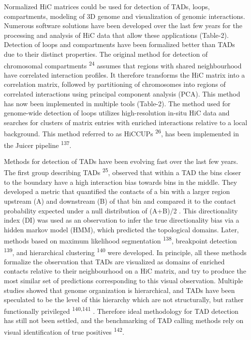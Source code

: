 \documentclass[11pt,twoside]{MPIthesis}
\theoremstyle{definition}
\theoremstyle{definition}
\theoremstyle{definition}
\theoremstyle{remark}
\begin{document}
Normalized HiC matrices could be used for detection of TADs, loops,
compartments, modeling of 3D genome and visualization of genomic
interactions. Numerous software solutions have been developed over the
last few years for the processing and analysis of HiC data that allow
these applications (Table-2). Detection of loops and compartments have
been formalized better than TADs due to their distinct properties. The
original method for detection of chromosomal compartments
\textsuperscript{24} assumes that regions with shared neighbourhood have
correlated interaction profiles. It therefore transforms the HiC matrix
into a correlation matrix, followed by partitioning of chromosomes into
regions of correlated interactions using principal component analysis
(PCA). This method has now been implemented in multiple tools (Table-2).
The method used for genome-wide detection of loops utilizes
high-resolution in-situ HiC data and searches for clusters of matrix
entries with enriched interactions relative to a local background. This
method referred to as HiCCUPs \textsuperscript{26}, has been implemented
in the Juicer pipeline \textsuperscript{137}.

Methods for detection of TADs have been evolving fast over the last few
years. The first group describing TADs \textsuperscript{25}, observed
that within a TAD the bins closer to the boundary have a high
interaction bias towards bins in the middle. They developed a metric
that quantified the contacts of a bin with a larger region upstream (A)
and downstream (B) of that bin and compared it to the contact
probability expected under a null distribution of (A+B)/2 . This
directionality index (DI) was used as an observation to infer the true
directionality bias via a hidden markov model (HMM), which predicted the
topological domains. Later, methods based on maximum likelihood
segmentation \textsuperscript{138}, breakpoint detection
\textsuperscript{139}, and hierarchical clustering \textsuperscript{140}
were developed. In principle, all these methods formalize the
observation that TADs are visualized as domains of enriched contacts
relative to their neighbourhood on a HiC matrix, and try to produce the
most similar set of predictions corresponding to this visual
observation. Multiple studies showed that genome organization is
hierarchical, and TADs have been speculated to be the level of this
hierarchy which are not structurally, but rather functionally privileged
\textsuperscript{140,141} . Therefore ideal methodology for TAD
detection has still not been settled, and the benchmarking of TAD
calling methods rely on visual identification of true positives
\textsuperscript{142}.
\end{document}
